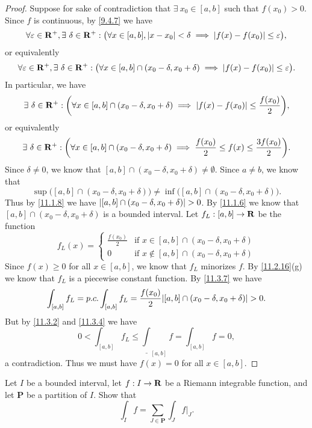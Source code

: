 \begin{proof}
  Suppose for sake of contradiction that \(\exists\ x_0 \in [a, b]\) such that \(f(x_0) > 0\).
  Since \(f\) is continuous, by \cref{9.4.7} we have
  \[
    \forall \varepsilon \in \mathbf{R}^+, \exists\ \delta \in \mathbf{R}^+ : \big(\forall x \in [a, b], \left\lvert x - x_0\right\rvert < \delta \implies \left\lvert f(x) - f(x_0)\right\rvert \leq \varepsilon\big),
  \]
  or equivalently
  \[
    \forall \varepsilon \in \R^+, \exists\ \delta \in \R^+ : \big(\forall x \in [a, b] \cap (x_0 - \delta, x_0 + \delta) \implies \abs{f(x) - f(x_0)} \leq \varepsilon\big).
  \]
  In particular, we have
  \[
    \exists\ \delta \in \mathbf{R}^+ : \bigg(\forall x \in [a, b] \cap (x_0 - \delta, x_0 + \delta) \implies \left\lvert f(x) - f(x_0)\right\rvert \leq \frac{f(x_0)}{2}\bigg),
  \]
  or equivalently
  \[
    \exists\ \delta \in \mathbf{R}^+ : \bigg(\forall x \in [a, b] \cap (x_0 - \delta, x_0 + \delta) \implies \frac{f(x_0)}{2} \leq f(x) \leq \frac{3 f(x_0)}{2}\bigg).
  \]
  Since \(\delta \neq 0\), we know that \([a, b] \cap (x_0 - \delta, x_0 + \delta) \neq \emptyset\).
  Since \(a \neq b\), we know that
  \[
    \sup\big([a, b] \cap (x_0 - \delta, x_0 + \delta)\big) \neq \inf\big([a, b] \cap (x_0 - \delta, x_0 + \delta)\big).
  \]
  Thus by \cref{11.1.8} we have \(\left\lvert[a, b] \cap (x_0 - \delta, x_0 + \delta)\right\rvert > 0\).
  By \cref{11.1.6} we know that \([a, b] \cap (x_0 - \delta, x_0 + \delta)\) is a bounded interval.
  Let \(f_L : [a, b] \to \mathbf{R}\) be the function
  \[
    f_L(x) = \begin{cases}
      \frac{f(x_0)}{2} & \text{if } x \in [a, b] \cap (x_0 - \delta, x_0 + \delta)    \\
      0                & \text{if } x \notin [a, b] \cap (x_0 - \delta, x_0 + \delta)
    \end{cases}
  \]
  Since \(f(x) \geq 0\) for all \(x \in [a, b]\), we know that \(f_L\) minorizes \(f\).
  By \cref{11.2.16}(g) we know that \(f_L\) is a piecewise constant function.
  By \cref{11.3.7} we have
  \[
    \int_{[a, b]} f_L = p.c. \int_{[a, b]} f_L = \frac{f(x_0)}{2}\abs{[a, b] \cap (x_0 - \delta, x_0 + \delta)} > 0.
  \]
  But by \cref{11.3.2} and \cref{11.3.4} we have
  \[
    0 < \int_{[a, b]} f_L \leq \underline{\int}_{[a, b]} f = \int_{[a, b]} f = 0,
  \]
  a contradiction.
  Thus we must have \(f(x) = 0\) for all \(x \in [a, b]\).
\end{proof}

\begin{exercise}\label{ex 11.4.3}
  Let \(I\) be a bounded interval, let \(f : I \to \mathbf{R}\) be a Riemann integrable function, and let \(\mathbf{P}\) be a partition of \(I\).
  Show that
  \[
    \int_I f = \sum_{J \in \mathbf{P}} \int_J f|_J.
  \]
\end{exercise}

